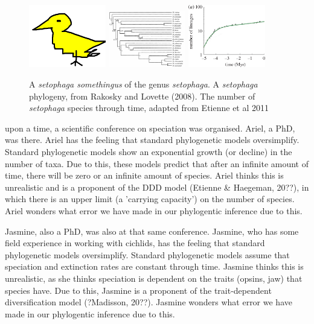\begin{figure}[H]


  \includegraphics[width=0.3\textwidth]{setophaga.png}
  \includegraphics[width=0.3\textwidth]{rabosky_lovette_2008_setophaga_phylogeny.png}
  \includegraphics[width=0.3\textwidth]{etienne_et_al_2011_fig_3_a.png}
  \caption{
    A \textit{setophaga somethingus} of the genus \textit{setophaga}.
    A \textit{setophaga} phylogeny, from Rakosky and Lovette (2008).
    The number of \textit{setophaga} species through time, adapted from Etienne et al 2011
  }
  \label{fig:setophaga}
\end{figure}



 upon a time, a scientific conference on speciation was
organised. Ariel, a PhD, was there. 
Ariel has the feeling that standard phylogenetic models
oversimplify. Standard phylogenetic models show
an exponential growth (or decline) in the number of taxa.
Due to this, these models predict that after an
infinite amount of time, there will be zero or an infinite amount of species.
Ariel thinks this is unrealistic and is a proponent of the DDD 
model (Etienne & Haegeman, 20??), in which there is an upper limit (a
'carrying capacity') on the number of species. Ariel wonders what
error we have made in our phylogentic inference due to this.

Jasmine, also a PhD, was also at that same conference. Jasmine, who
has some field experience in working with cichlids, 
has the feeling that standard phylogenetic models
oversimplify. Standard phylogenetic models assume that speciation and
extinction rates are constant through time. 
Jasmine thinks this is unrealistic, as she thinks 
speciation is dependent on the traits (opsins, jaw) that species have.
Due to this, Jasmine is a proponent of the trait-dependent
diversification model (?Madisson, 20??). Jasmine wonders what
error we have made in our phylogentic inference due to this.

